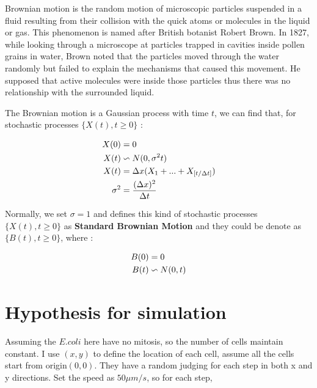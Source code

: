 Brownian motion is the random motion of microscopic particles suspended in a fluid resulting from their collision with the quick atoms or molecules in the liquid or gas. This phenomenon is named after British botanist Robert Brown. In 1827, while looking through a microscope at particles trapped in cavities inside pollen grains in water, Brown noted that the particles moved through the water randomly but failed to explain the mechanisms that caused this movement. He supposed that active molecules were inside those particles thus there was no relationship with the surrounded liquid. 

The Brownian motion is a Gaussian process with time $t$, we can find that, for stochastic processes $\{X(t),t\geq0\}$ :

\begin{equation*} 
\begin{aligned} 
\centering
X(0) &= 0 \\
X(t) &\backsim N(0,\sigma^2t)  \\ 
X(t) &= \Delta x(X_1 + ... + X_{[t/\Delta t]}) \\
\sigma^2 &=  \frac{(\Delta x)^2}{\Delta t} \\
\end{aligned} 
\end{equation*}

\newpage
Normally, we set $\sigma=1$ and defines this kind of stochastic processes $\{X(t),t\geq0\}$ as \textbf{Standard Brownian Motion} and they could be denote as $\{B(t),t\geq0\}$, where :

\begin{equation*} 
\begin{aligned} 
\centering
B(0) &= 0 \\
B(t) &\backsim N(0,t)  \\ 
\end{aligned} 
\end{equation*}

\section{Hypothesis for simulation}

Assuming the $E.coli$ here have no mitosis, so the number of cells maintain constant.
I use $(x,y)$ to define the location of each cell, assume all the cells start from origin$(0,0)$. They have a random judging for each step in both x and y directions. Set the speed as $50 \mu m/s$, so for each step,


